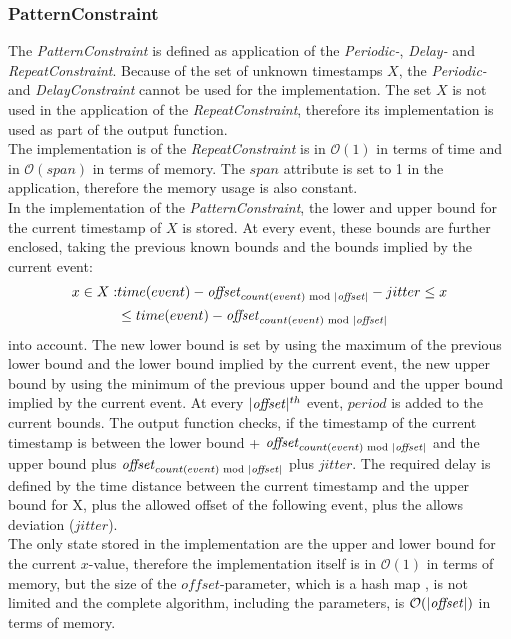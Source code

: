 \subsubsection{PatternConstraint}
	The \emph{PatternConstraint} is defined as application of the \emph{Periodic-}, \emph{Delay-} and \emph{RepeatConstraint}. Because of the set of unknown timestamps $X$, the \emph{Periodic-} and \emph{DelayConstraint} cannot be used for the implementation. The set $X$ is not used in the application of the \emph{RepeatConstraint}, therefore its implementation is used as part of the output function.\\
	The implementation is of the \emph{RepeatConstraint} is in $\mathcal{O}(1)$ in terms of time and in $\mathcal{O}(span)$ in terms of memory. The $span$ attribute is set to 1 in the application, therefore the memory usage is also constant.\\
	In the implementation of the \emph{PatternConstraint}, the lower and upper bound for the current timestamp of $X$ is stored. At every event, these bounds are further enclosed, taking the previous known bounds and the bounds implied by the current event:
	\begin{align}
		x\in X: &time(event)-\text{\emph{offset}}_{count(event)\text{ mod }|\text{\emph{offset}}|}-jitter \leq x\\
			     &\leq  time(event)-\text{\emph{offset}}_{count(event)\text{ mod }|\text{\emph{offset}}|}
	\end{align}
	into account. The new lower bound is set by using the maximum of the previous lower bound and the lower bound implied by the current event, the new upper bound by using the minimum of the previous upper bound and the upper bound implied by the current event. At every $|\text{\emph{offset}}|^{th}$ event, $period$ is added to the current bounds. The output function checks, if the timestamp of the current timestamp is between the lower bound + $\text{\emph{offset}}_{count(event)\text{ mod }|\text{\emph{offset}}|}$ and the upper bound plus $\text{\emph{offset}}_{count(event)\text{ mod }|\text{\emph{offset}}|}$ plus $jitter$.  The required delay is defined by the time distance between the current timestamp and the upper bound for X, plus the allowed offset of the following event, plus the allows deviation ($jitter$).\\
	The only state stored in the implementation are the upper and lower bound for the  current $x$-value, therefore the implementation itself is in $\mathcal{O}(1)$ in terms of memory, but the size of the $offset$-parameter, which is a hash map%
	, is not limited and the complete algorithm, including the parameters, is $\mathcal{O}(|\text{\emph{offset}}|)$ in terms of memory.
	
